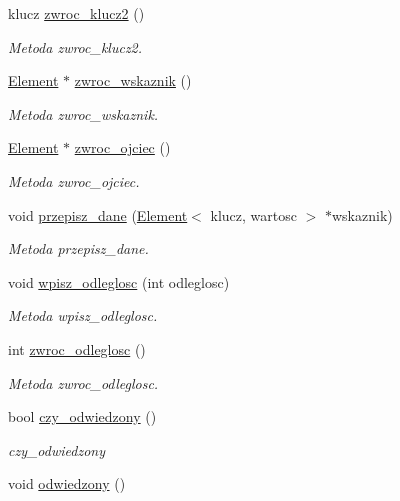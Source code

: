 \begin{DoxyCompactItemize}
klucz \hyperlink{class_element_a432a0f6d8a5291051644667a39a3c1ba}{zwroc\+\_\+klucz2} ()
\begin{DoxyCompactList}\small\item\em Metoda zwroc\+\_\+klucz2. \end{DoxyCompactList}\item 
\hyperlink{class_element}{Element} $\ast$ \hyperlink{class_element_acee0fb7c5bbe330961d16e6e672d07d2}{zwroc\+\_\+wskaznik} ()
\begin{DoxyCompactList}\small\item\em Metoda zwroc\+\_\+wskaznik. \end{DoxyCompactList}\item 
\hyperlink{class_element}{Element} $\ast$ \hyperlink{class_element_ac24b7bfe84763613a838012e85ad4ac4}{zwroc\+\_\+ojciec} ()
\begin{DoxyCompactList}\small\item\em Metoda zwroc\+\_\+ojciec. \end{DoxyCompactList}\item 
void \hyperlink{class_element_aacd6653f0fa6475a8b2e122dddf80627}{przepisz\+\_\+dane} (\hyperlink{class_element}{Element}$<$ klucz, wartosc $>$ $\ast$wskaznik)
\begin{DoxyCompactList}\small\item\em Metoda przepisz\+\_\+dane. \end{DoxyCompactList}\item 
void \hyperlink{class_element_ae0248f2b0dac9b17f4a9194f578b3988}{wpisz\+\_\+odleglosc} (int odleglosc)
\begin{DoxyCompactList}\small\item\em Metoda wpisz\+\_\+odleglosc. \end{DoxyCompactList}\item 
int \hyperlink{class_element_a5eba01e4be54f34e12452769a7343499}{zwroc\+\_\+odleglosc} ()
\begin{DoxyCompactList}\small\item\em Metoda zwroc\+\_\+odleglosc. \end{DoxyCompactList}\item 
bool \hyperlink{class_element_a92f1c6c72a7b768cd2d295eb6b6c3d0e}{czy\+\_\+odwiedzony} ()
\begin{DoxyCompactList}\small\item\em czy\+\_\+odwiedzony \end{DoxyCompactList}\item 
void \hyperlink{class_element_af45d4a7953e01a1d9916eed0ab17f6bb}{odwiedzony} ()

\end{DoxyCompactItemize}
